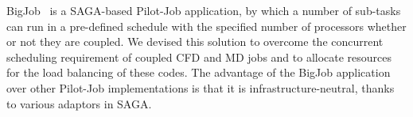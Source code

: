 \documentclass[preprint,12pt]{elsarticle}
\newcommand{\skonote}[1]{ {\textcolor{green} { ***Jeff: #1 }}}
\newcommand{\skonote}[1]{}
\begin{document}


BigJob~\cite{repex_ptrsa} is a SAGA-based Pilot-Job application, by which a number of sub-tasks can run in a pre-defined schedule with the specified number of processors whether or not they are coupled. We devised this solution to overcome the concurrent scheduling requirement of coupled CFD and MD jobs and to allocate resources for the load balancing of these codes. The advantage of the BigJob application over other Pilot-Job implementations is that it is infrastructure-neutral, thanks to various adaptors in SAGA.

\end{document}
